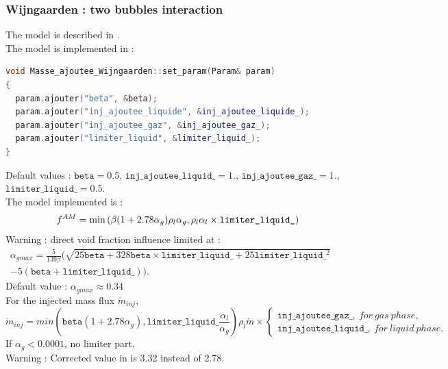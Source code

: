 \subsubsection{Wijngaarden : two bubbles interaction}
The model is described in \cite{Biesheuvel1984}.\\
The model is implemented in :
\begin{lstlisting}[language=c++]
void Masse_ajoutee_Wijngaarden::set_param(Param& param)
{
  param.ajouter("beta", &beta);
  param.ajouter("inj_ajoutee_liquide", &inj_ajoutee_liquide_);
  param.ajouter("inj_ajoutee_gaz", &inj_ajoutee_gaz_);
  param.ajouter("limiter_liquid", &limiter_liquid_);
}
\end{lstlisting}
Default values : $\texttt{beta}=0.5$, $\texttt{inj\_ajoutee\_liquid\_}=1.$, $\texttt{inj\_ajoutee\_gaz\_}=1.$, $\texttt{limiter\_liquid\_} = 0.5$.\\
The model implemented is :
\begin{equation}
   f^{AM}=\min\left( \beta(1+2.78\alpha_g) \rho_l\alpha_g,\rho_l\alpha_l\times{}\texttt{limiter\_liquid\_} \right)
\end{equation}
{\color{red} Warning} : direct void fraction influence limited at :
\begin{equation}
\begin{aligned}
    \alpha_{gmax}=\frac{5}{139\beta}(\sqrt{25\texttt{beta}+328\texttt{beta} \times \texttt{limiter\_liquid\_}+25 \texttt{limiter\_liquid\_}^2} & & \\ -5(\texttt{beta}+\texttt{limiter\_liquid\_})).
\end{aligned}
\end{equation}
Default value : $\alpha_{gmax}\approx 0.34$\\
For the injected mass flux $\dot{m}_{inj}$,
\begin{equation}
   \dot{m}_{inj}=min(\texttt{beta}(1+2.78\alpha_g),\texttt{limiter\_liquid\_}\frac{\alpha_l}{\alpha_g}) \rho_l\dot{m}\times\begin{cases} \texttt{inj\_ajoutee\_gaz\_},\ for\ gas\ phase,\\ \texttt{inj\_ajoutee\_liquid\_},\ for\ liquid\ phase.
   \end{cases}
\end{equation}
If $\alpha_g< 0.0001$, no limiter part.\\
{\color{red} Warning} : Corrected value in \cite{Biesheuvel1984} is 3.32 instead of 2.78.

%
